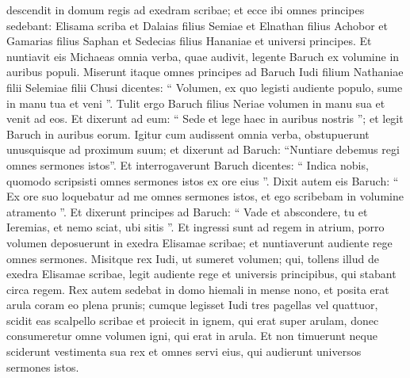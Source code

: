 \begin{biblechapter}
\begin{biblechapter}
\begin{biblechapter}
\begin{biblechapter}
\begin{biblechapter}
\begin{biblechapter}
\begin{biblechapter}
\begin{biblechapter}
\begin{biblechapter}
\begin{biblechapter}
\begin{biblechapter}
\begin{biblechapter}
\begin{biblechapter}
\begin{biblechapter}
\begin{biblechapter}
\begin{biblechapter}
\begin{biblechapter}
\begin{biblechapter}
\begin{biblechapter}
\begin{biblechapter}
\begin{biblechapter}
\begin{biblechapter}
\begin{biblechapter}
\begin{biblechapter}
\begin{biblechapter}
\begin{biblechapter}
\begin{biblechapter}
\begin{biblechapter}
\begin{biblechapter}
\begin{biblechapter}
\begin{biblechapter}
\begin{biblechapter}
\begin{biblechapter}
\begin{biblechapter}
\begin{biblechapter}
\begin{biblechapter}
\verse descendit in domum regis ad exedram scribae; et ecce ibi omnes principes sedebant: Elisama scriba et Dalaias filius Semiae et Elnathan filius Achobor et Gamarias filius Saphan et Sedecias filius Hananiae et universi principes. 
\verse Et nuntiavit eis Michaeas omnia verba, quae audivit, legente Baruch ex volumine in auribus populi. 
\verse Miserunt itaque omnes principes ad Baruch Iudi filium Nathaniae filii Selemiae filii Chusi dicentes: “ Volumen, ex quo legisti audiente populo, sume in manu tua et veni ”. Tulit ergo Baruch filius Neriae volumen in manu sua et venit ad eos. 
\verse Et dixerunt ad eum: “ Sede et lege haec in auribus nostris ”; et legit Baruch in auribus eorum. 
\verse Igitur cum audissent omnia verba, obstupuerunt unusquisque ad proximum suum; et dixerunt ad Baruch: “Nuntiare debemus regi omnes sermones istos”. 
\verse Et interrogaverunt Baruch dicentes: “ Indica nobis, quomodo scripsisti omnes sermones istos ex ore eius ”. 
\verse Dixit autem eis Baruch: “ Ex ore suo loquebatur ad me omnes sermones istos, et ego scribebam in volumine atramento ”. 
 \verse Et dixerunt principes ad Baruch: “ Vade et abscondere, tu et Ieremias, et nemo sciat, ubi sitis ”. 
\verse Et ingressi sunt ad regem in atrium, porro volumen deposuerunt in exedra Elisamae scribae; et nuntiaverunt audiente rege omnes sermones.
 \verse Misitque rex Iudi, ut sumeret volumen; qui, tollens illud de exedra Elisamae scribae, legit audiente rege et universis principibus, qui stabant circa regem. 
\verse Rex autem sedebat in domo hiemali in mense nono, et posita erat arula coram eo plena prunis; 
\verse cumque legisset Iudi tres pagellas vel quattuor, scidit eas scalpello scribae et proiecit in ignem, qui erat super arulam, donec consumeretur omne volumen igni, qui erat in arula. 
\verse Et non timuerunt neque sciderunt vestimenta sua rex et omnes servi eius, qui audierunt universos sermones istos. 

\end{biblechapter}
\end{biblechapter}
\end{biblechapter}
\end{biblechapter}
\end{biblechapter}
\end{biblechapter}
\end{biblechapter}
\end{biblechapter}
\end{biblechapter}
\end{biblechapter}
\end{biblechapter}
\end{biblechapter}
\end{biblechapter}
\end{biblechapter}
\end{biblechapter}
\end{biblechapter}
\end{biblechapter}
\end{biblechapter}
\end{biblechapter}
\end{biblechapter}
\end{biblechapter}
\end{biblechapter}
\end{biblechapter}
\end{biblechapter}
\end{biblechapter}
\end{biblechapter}
\end{biblechapter}
\end{biblechapter}
\end{biblechapter}
\end{biblechapter}
\end{biblechapter}
\end{biblechapter}
\end{biblechapter}
\end{biblechapter}
\end{biblechapter}
\end{biblechapter}
